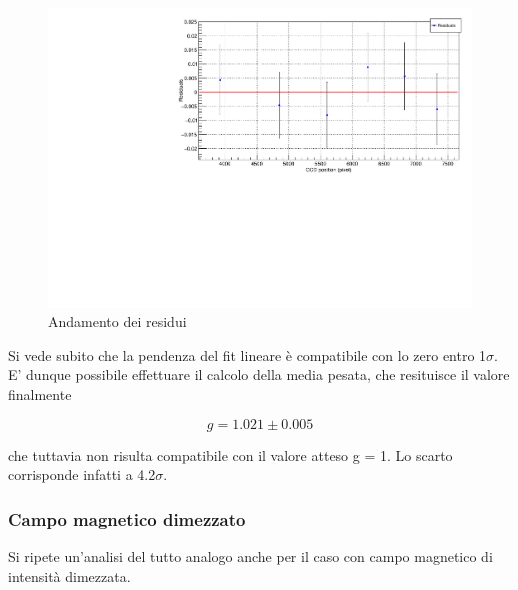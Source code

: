 \documentclass{article}
\begin{document}
	\begin{center}
		\begin{figure}[H]
			\centering
			\includegraphics[scale=0.38, angle=0]{campomax/g_residuals.pdf}
			\caption{Andamento dei residui}
			\label{fig:g_res}
		\end{figure}
	\end{center}

	Si vede subito che la pendenza del fit lineare è compatibile con lo zero entro 1$\sigma$. E' dunque
	possibile effettuare il calcolo della media pesata, che resituisce il valore finalmente

	\[
		g = 1.021 \pm 0.005	
	\]
	
	che tuttavia non risulta compatibile con il valore atteso g = 1.
	Lo scarto corrisponde infatti a 4.2$\sigma$.  

	 
	\subsubsection*{Campo magnetico dimezzato}

	Si ripete un'analisi del tutto analogo anche per il caso con campo magnetico di intensità dimezzata.
	
\end{document}
